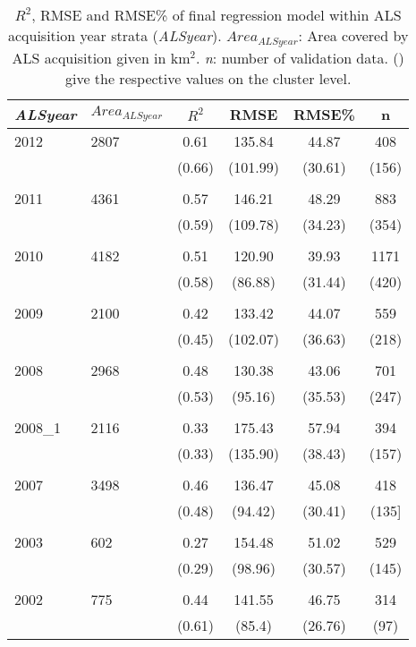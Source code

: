 \begin{table}[ht]
\begin{center}
	\caption{$R^2$, RMSE and RMSE\% of final regression model within ALS acquisition year strata (\textit{ALSyear}). $Area_{ALSyear}$: Area covered by ALS acquisition given in km$^2$. \textit{n}: number of validation data. () give the respective values on the cluster level.}
	\label{tab:adj_r2_within}
	{\small %
	\begin{tabular}{llcccc}
		\hline
		\textit{ALSyear} & $Area_{ALSyear}$ & $R^2$ & RMSE & RMSE\% & n \\ 
		\hline
         2012  & 2807  &  0.61  &  135.84  &  44.87  &  408  \\ 
          &&             (0.66) & (101.99) & (30.61) & (156) \\ 
         \\
         2011  & 4361  &  0.57   & 146.21   &  48.29  & 883  \\ 
          &&             (0.59)  & (109.78) & (34.23) & (354) \\
         \\
         2010 & 4182     & 0.51  & 120.90   & 39.93  & 1171 \\ 
          &&             (0.58)  & (86.88) & (31.44) & (420) \\
          \\       
         2009 & 2100     & 0.42  & 133.42  & 44.07  & 559  \\   
          &&             (0.45)  & (102.07) & (36.63) & (218) \\
          \\               
         2008 & 2968     & 0.48  & 130.38   & 43.06  & 701  \\        
          &&             (0.53)  & (95.16) & (35.53) & (247) \\
          \\                       
         2008\_1 & 2116  & 0.33  & 175.43  & 57.94  & 394  \\      
          &&             (0.33)  & (135.90) & (38.43) & (157) \\
          \\             
         2007 & 3498     & 0.46  & 136.47   & 45.08   & 418  \\ 
          &&             (0.48)  & (94.42)  & (30.41) & (135] \\
          \\  
         2003 & 602      & 0.27  & 154.48   & 51.02  & 529  \\ 
         &&             (0.29)  & (98.96) & (30.57) & (145) \\
         \\ 
         2002 & 775      & 0.44  & 141.55   & 46.75   & 314   \\ 
         &&             (0.61) & (85.4) & (26.76) & (97) \\
		\hline
        \hline
\end{tabular}
	}%
\end{center}
\end{table}

